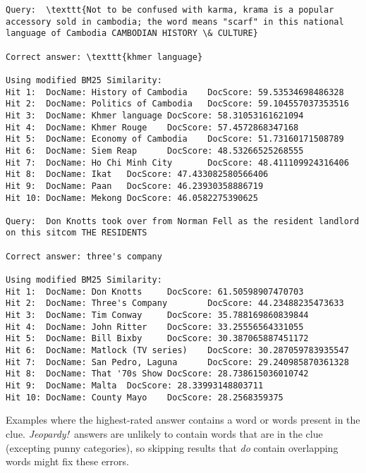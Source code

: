 \documentclass[11pt,letterpaper]{article}
\begin{document}
\begin{table*}[tbh!]
	\small
\begin{verbatim}
Query:  \texttt{Not to be confused with karma, krama is a popular 
accessory sold in cambodia; the word means "scarf" in this national
language of Cambodia CAMBODIAN HISTORY \& CULTURE}

Correct answer: \texttt{khmer language}

Using modified BM25 Similarity:
Hit 1:  DocName: History of Cambodia    DocScore: 59.53534698486328
Hit 2:  DocName: Politics of Cambodia   DocScore: 59.104557037353516
Hit 3:  DocName: Khmer language DocScore: 58.31053161621094
Hit 4:  DocName: Khmer Rouge    DocScore: 57.4572868347168
Hit 5:  DocName: Economy of Cambodia    DocScore: 51.73160171508789
Hit 6:  DocName: Siem Reap      DocScore: 48.53266525268555
Hit 7:  DocName: Ho Chi Minh City       DocScore: 48.411109924316406
Hit 8:  DocName: Ikat   DocScore: 47.433082580566406
Hit 9:  DocName: Paan   DocScore: 46.23930358886719
Hit 10: DocName: Mekong DocScore: 46.0582275390625

Query:  Don Knotts took over from Norman Fell as the resident landlord 
on this sitcom THE RESIDENTS

Correct answer: three's company

Using modified BM25 Similarity:
Hit 1:  DocName: Don Knotts     DocScore: 61.50598907470703
Hit 2:  DocName: Three's Company        DocScore: 44.23488235473633
Hit 3:  DocName: Tim Conway     DocScore: 35.788169860839844
Hit 4:  DocName: John Ritter    DocScore: 33.25556564331055
Hit 5:  DocName: Bill Bixby     DocScore: 30.387065887451172
Hit 6:  DocName: Matlock (TV series)    DocScore: 30.287059783935547
Hit 7:  DocName: San Pedro, Laguna      DocScore: 29.240985870361328
Hit 8:  DocName: That '70s Show DocScore: 28.738615036010742
Hit 9:  DocName: Malta  DocScore: 28.33993148803711
Hit 10: DocName: County Mayo    DocScore: 28.2568359375
\end{verbatim}
\normalsize
\caption{Examples where the highest-rated answer contains a word or words present in the clue. \textit{Jeopardy!}~answers are unlikely to contain words that are in the clue (excepting punny categories), so skipping results that \textit{do} contain overlapping words might fix these errors.}
\label{table-repeat}
\end{table*}
\end{document}
